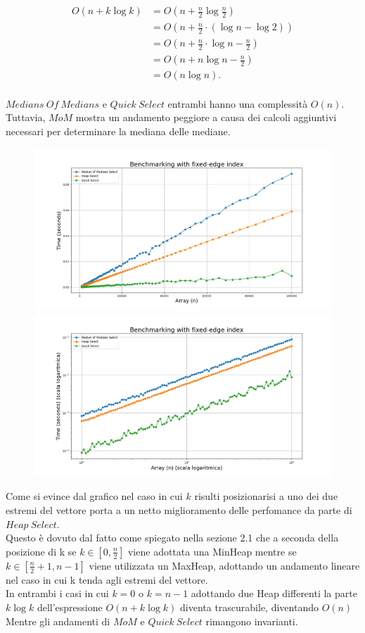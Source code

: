 \documentclass[a4paper]{article}
\begin{document}
\begin{align*}
O(n + k \log k) & = O\left(n + \frac{n}{2} \log \frac{n}{2}\right) \\
& = O\left(n + \frac{n}{2} \cdot (\log n - \log 2)\right) \\
& = O(n + \frac{n}{2} \cdot \log n - \frac{n}{2}) \\
& = O(n + n \log n - \frac{n}{2}) \\
& = O(n \log n).
\end{align*}\\
$Medians\ Of\ Medians$ e $Quick\ Select$ entrambi hanno una complessità $O(n)$. Tuttavia, $MoM$ mostra un andamento peggiore a causa dei calcoli aggiuntivi necessari per determinare la mediana delle mediane.
\newpage
\begin{figure}[h]
            \centering
            \includegraphics[width=.83\textwidth]{graphs/k_last_n.png}
            \includegraphics[width=.83\textwidth]{graphs/k_last_2xlog.png}
\end{figure}
Come si evince dal grafico nel caso in cui $k$ risulti posizionarisi a uno dei due estremi del vettore porta a un netto miglioramento delle perfomance da parte di $Heap\ Select$.\\
Questo è dovuto dal fatto come spiegato nella sezione 2.1 che a seconda della posizione di k se $k\in[0,\frac{n}{2}]$ viene adottata una MinHeap mentre se $k\in[\frac{n}{2}+1,n-1]$ viene utilizzata un MaxHeap, adottando un andamento lineare nel caso in cui k tenda agli estremi del vettore.\\
In entrambi i casi in cui $k=0$ o $k=n-1$ adottando due Heap differenti la parte $k\log k$ dell'espressione $O(n+k\log k)$ diventa trascurabile, diventando $O(n)$\\
Mentre gli andamenti di $MoM$ e $Quick\ Select$ rimangono invarianti.\\
\newpage
\end{document}
